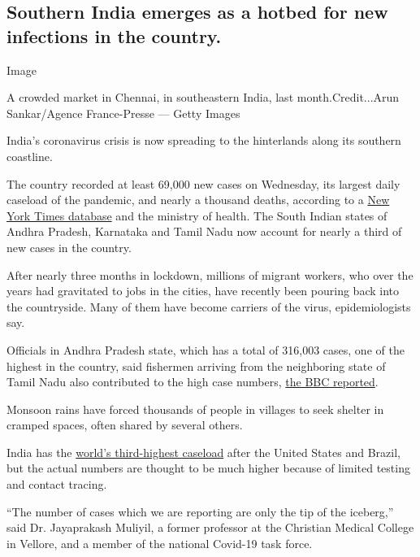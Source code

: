 \hypertarget{southern-india-emerges-as-a-hotbed-for-new-infections-in-the-country}{%
\subsection{Southern India emerges as a hotbed for new infections in the
country.}\label{southern-india-emerges-as-a-hotbed-for-new-infections-in-the-country}}

Image

A crowded market in Chennai, in southeastern India, last
month.Credit...Arun Sankar/Agence France-Presse --- Getty Images

India's coronavirus crisis is now spreading to the hinterlands along its
southern coastline.

The country recorded at least 69,000 new cases on Wednesday, its largest
daily caseload of the pandemic, and nearly a thousand deaths, according
to a
\href{https://www.nytimes3xbfgragh.onion/interactive/2020/world/asia/india-coronavirus-cases.html}{New
York Times database} and the ministry of health. The South Indian states
of Andhra Pradesh, Karnataka and Tamil Nadu now account for nearly a
third of new cases in the country.

After nearly three months in lockdown, millions of migrant workers, who
over the years had gravitated to jobs in the cities, have recently been
pouring back into the countryside. Many of them have become carriers of
the virus, epidemiologists say.

Officials in Andhra Pradesh state, which has a total of 316,003 cases,
one of the highest in the country, said fishermen arriving from the
neighboring state of Tamil Nadu also contributed to the high case
numbers, \href{https://www.bbc.com/news/world-asia-india-53674855}{the
BBC reported}.

Monsoon rains have forced thousands of people in villages to seek
shelter in cramped spaces, often shared by several others.

India has the
\href{https://www.nytimes3xbfgragh.onion/interactive/2020/world/coronavirus-maps.html}{world's
third-highest caseload} after the United States and Brazil, but the
actual numbers are thought to be much higher because of limited testing
and contact tracing.

``The number of cases which we are reporting are only the tip of the
iceberg,'' said Dr. Jayaprakash Muliyil, a former professor at the
Christian Medical College in Vellore, and a member of the national
Covid-19 task force.

